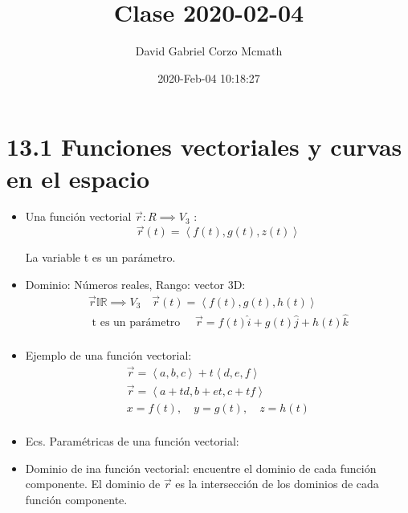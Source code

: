 \documentclass{article}
\title{Clase 2020-02-04}
\author{David Gabriel Corzo Mcmath}
\date{2020-Feb-04 10:18:27}
\begin{document}
\maketitle

\section{13.1 Funciones vectoriales y curvas en el espacio}
\begin{itemize}
    \item Una función vectorial $\vec{r}: R \implies V_3$ :
    \[
      \vec{r}(t) = \left\langle f(t),g(t),z(t) \right\rangle 
    \]
    
    La variable t es un parámetro.
    
    \item Dominio: Números reales, Rango: vector 3D:
        \begin{align*}
            \vec{r} \mathbb{IR} \implies V_3 \quad \vec{r}(t) = \left\langle f(t),g(t),h(t) \right\rangle \\ 
            \text{  t es un parámetro  } \quad \vec{r} = f(t)\hat{i} + g(t)\hat{j} + h(t)\hat{k} \\
        \end{align*}
    
    \item Ejemplo de una función vectorial:
        \begin{align*}
            \vec{r} = \left\langle a,b,c \right\rangle  + t \left\langle d,e,f \right\rangle \\ 
            \vec{r} = \left\langle a+td,b+et,c+tf \right\rangle \\ 
            x = f(t), \quad y = g(t), \quad z = h(t) \\ 
        \end{align*}
    
    \item Ecs. Paramétricas de una función vectorial: 
    
    \item Dominio de ina función vectorial: encuentre el dominio de cada función componente. El dominio de $\vec{r}$ es la intersección de los dominios de cada función componente.
\end{itemize}

\end{document}
